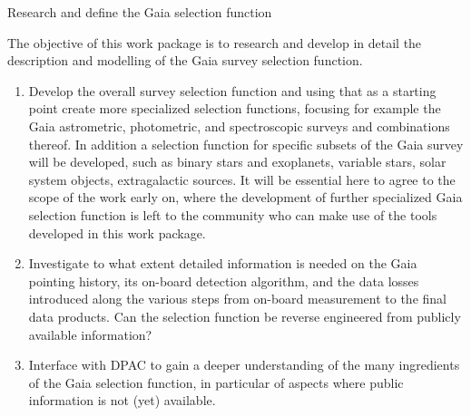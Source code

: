\begin{workpackage}{Research and define the Gaia selection function}
  \label{wp:selfungaia}
  \wpend{\duration} %
  
  \makewptable %

  \begin{wpobjectives}
    The objective of this work package is to research and develop in detail the description and modelling of the Gaia survey selection function.
    \begin{enumerate}
      \item Develop the overall survey selection function and using that as a starting point create more specialized selection functions, focusing for example the Gaia astrometric, photometric, and spectroscopic surveys and combinations thereof. In addition a selection function for specific subsets of the Gaia survey will be developed, such as binary stars and exoplanets, variable stars, solar system objects, extragalactic sources. It will be essential here to agree to the scope of the work early on, where the development of further specialized Gaia selection function is left to the community who can make use of the tools developed in this work package. 
      \item Investigate to what extent detailed information is needed on the Gaia pointing history, its on-board detection algorithm, and the data losses introduced along the various steps from on-board measurement to the final data products. Can the selection function be reverse engineered from publicly available information?
      \item Interface with DPAC to gain a deeper understanding of the many ingredients of the Gaia selection function, in particular of aspects where public information is not (yet) available. 
    \end{enumerate}
  \end{wpobjectives}

  \begin{wpdescription}


\end{wpdescription}
\end{workpackage}
